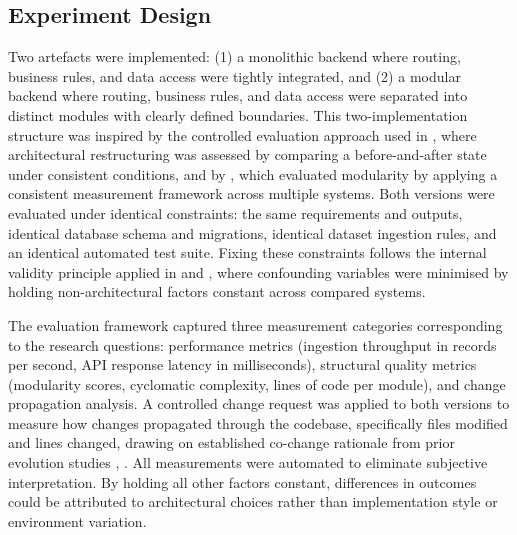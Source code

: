 ﻿\documentclass[conference]{IEEEtran}
\begin{document}
\subsection{Experiment Design}
Two artefacts were implemented: (1) a monolithic backend where routing, business rules, and data access were tightly integrated, and (2) a modular backend where routing, business rules, and data access were separated into distinct modules with clearly defined boundaries. This two-implementation structure was inspired by the controlled evaluation approach used in \cite{b7}, where architectural restructuring was assessed by comparing a before-and-after state under consistent conditions, and by \cite{b4}, which evaluated modularity by applying a consistent measurement framework across multiple systems. Both versions were evaluated under identical constraints: the same requirements and outputs, identical database schema and migrations, identical dataset ingestion rules, and an identical automated test suite. Fixing these constraints follows the internal validity principle applied in \cite{b3} and \cite{b6}, where confounding variables were minimised by holding non-architectural factors constant across compared systems.

The evaluation framework captured three measurement categories corresponding to the research questions: performance metrics (ingestion throughput in records per second, API response latency in milliseconds), structural quality metrics (modularity scores, cyclomatic complexity, lines of code per module), and change propagation analysis. A controlled change request was applied to both versions to measure how changes propagated through the codebase, specifically files modified and lines changed, drawing on established co-change rationale from prior evolution studies \cite{b3}, \cite{b7}. All measurements were automated to eliminate subjective interpretation. By holding all other factors constant, differences in outcomes could be attributed to architectural choices rather than implementation style or environment variation.
\end{document}
